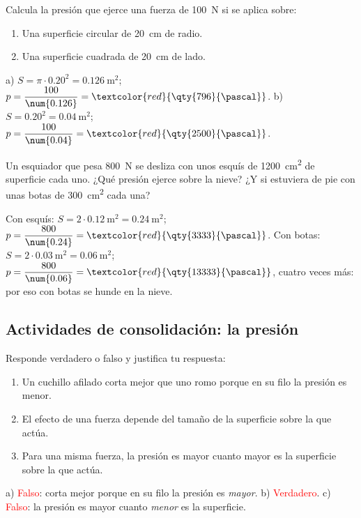\begin{exercise}
    Calcula la presión que ejerce una fuerza de \qty{100}{\newton} si se aplica sobre:
    \begin{enumerate}[label=\alph*)]
        \item Una superficie circular de \qty{20}{\cm} de radio.
        \item Una superficie cuadrada de \qty{20}{\cm} de lado.
    \end{enumerate}
    \begin{solu}
        a) \(S = \pi \cdot \num{0.20}^2 = \qty{0.126}{\square\m}\); \(p = \dfrac{100}{\num{0.126}} = \textcolor{red}{\qty{796}{\pascal}}\).
        b) \(S = \num{0.20}^2 = \qty{0.04}{\square\m}\); \(p = \dfrac{100}{\num{0.04}} = \textcolor{red}{\qty{2500}{\pascal}}\).
    \end{solu}
\end{exercise}

\begin{exercise}
    Un esquiador que pesa \qty{800}{\newton} se desliza con unos esquís de \qty{1200}{\square\cm} de superficie cada uno. ¿Qué presión ejerce sobre la nieve? ¿Y si estuviera de pie con unas botas de \qty{300}{\square\cm} cada una?
    \begin{solu}
        Con esquís: \(S = 2 \cdot \qty{0.12}{\square\m} = \qty{0.24}{\square\m}\); \(p = \dfrac{800}{\num{0.24}} = \textcolor{red}{\qty{3333}{\pascal}}\).
        Con botas: \(S = 2 \cdot \qty{0.03}{\square\m} = \qty{0.06}{\square\m}\); \(p = \dfrac{800}{\num{0.06}} = \textcolor{red}{\qty{13333}{\pascal}}\), cuatro veces más: por eso con botas se hunde en la nieve.
    \end{solu}
\end{exercise}

\subsection*{Actividades de consolidación: la presión}

\begin{exercise}
    Responde verdadero o falso y justifica tu respuesta:
    \begin{enumerate}[label=\alph*)]
        \item Un cuchillo afilado corta mejor que uno romo porque en su filo la presión es menor.
        \item El efecto de una fuerza depende del tamaño de la superficie sobre la que actúa.
        \item Para una misma fuerza, la presión es mayor cuanto mayor es la superficie sobre la que actúa.
    \end{enumerate}
    \begin{solu}
        a) \textcolor{red}{Falso}: corta mejor porque en su filo la presión es \emph{mayor}. b) \textcolor{red}{Verdadero}. c) \textcolor{red}{Falso}: la presión es mayor cuanto \emph{menor} es la superficie.
    \end{solu}
\end{exercise}

